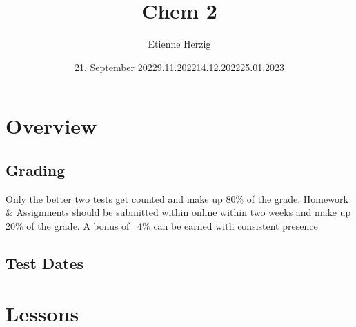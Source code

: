 \documentclass{article}
\title{Chem 2}
\author{Etienne Herzig}
\date{21. September 2022}
\begin{document}
\setlength{\textheight}{680pt}

\maketitle
\clearpage
\section{Overview}
\subsection{Grading}
Only the better two tests get counted and make up 80\% of the grade.
Homework \& Assignments should be submitted within online within two weeks and make up 20\% of the grade.
 A bonus of ~4\% can be earned with consistent presence
\subsection{Test Dates}
\date{9.11.2022}\hfill\break
\date{14.12.2022}\hfill\break
\date{25.01.2023}\hfill\break
\clearpage
\section{Lessons}
\end{document}
